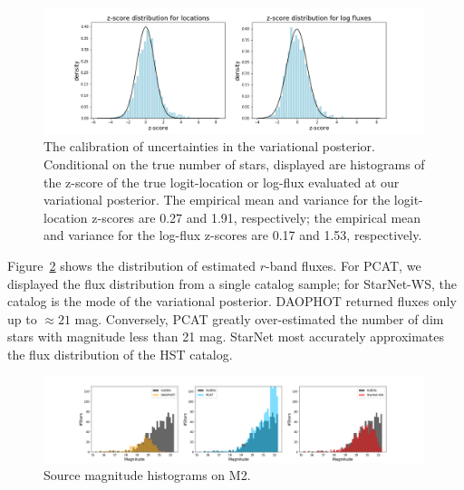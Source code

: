\begin{figure}[ht]
    \centering
    \includegraphics[width=0.99\textwidth]{figures/z-score_calibration.png}
    \caption{The calibration of uncertainties in the variational posterior. 
    Conditional on the true number of stars, displayed are histograms of the z-score of the true logit-location or log-flux evaluated at our variational posterior. 
    The empirical mean and variance for the logit-location z-scores are 0.27 and 1.91, respectively; the empirical mean and variance for the log-flux z-scores are 0.17 and 1.53, respectively. 
}
    \label{fig:z-score_calibration}
\end{figure}

Figure~\ref{fig:luminosity_fun_m2} shows the distribution of estimated $r$-band fluxes. For PCAT, we displayed the flux distribution from a single catalog sample; for StarNet-WS, the catalog is the mode of the variational posterior. DAOPHOT returned fluxes only up to $\approx21$ mag.
Conversely, PCAT greatly over-estimated the number of dim stars with magnitude less than 21 mag. StarNet most accurately approximates the flux distribution of the HST catalog. 

\begin{figure}[ht]
    \centering
    \includegraphics[width=0.99\textwidth]{figures/luminosity_fun.png}
    \caption{Source magnitude histograms on M2. }
    \label{fig:luminosity_fun_m2}
\end{figure}

